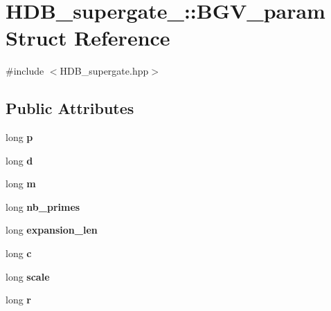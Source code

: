 \hypertarget{structHDB__supergate___1_1BGV__param}{}\section{H\+D\+B\+\_\+supergate\+\_\+\+:\+:B\+G\+V\+\_\+param Struct Reference}
\label{structHDB__supergate___1_1BGV__param}


{\ttfamily \#include $<$H\+D\+B\+\_\+supergate.\+hpp$>$}

\subsection*{Public Attributes}
\begin{DoxyCompactItemize}
\item 
\mbox{\label{structHDB__supergate___1_1BGV__param_a1cb3ca0b771088d134faa25cfd1c5411}} 
long {\bfseries p}
\item 
\mbox{\label{structHDB__supergate___1_1BGV__param_a40b5869dec01b040ff8e95b12099ac64}} 
long {\bfseries d}
\item 
\mbox{\label{structHDB__supergate___1_1BGV__param_af03d7e88051b3aa734669623a496d856}} 
long {\bfseries m}
\item 
\mbox{\label{structHDB__supergate___1_1BGV__param_a997922261a8c8107f9e32b4e71d53149}} 
long {\bfseries nb\+\_\+primes}
\item 
\mbox{\label{structHDB__supergate___1_1BGV__param_ad6b3808291510424eea1796f2e6f4266}} 
long {\bfseries expansion\+\_\+len}
\item 
\mbox{\label{structHDB__supergate___1_1BGV__param_a9e0985ac045e3f232a9a9a52da7a099f}} 
long {\bfseries c}
\item 
\mbox{\label{structHDB__supergate___1_1BGV__param_a0ea6e2b8444bff43c4f80da56d7a04b3}} 
long {\bfseries scale}
\item 
\mbox{\label{structHDB__supergate___1_1BGV__param_a351f164e8025bfdc7541b25a8cf17d8f}} 
long {\bfseries r}
\end{DoxyCompactItemize}


